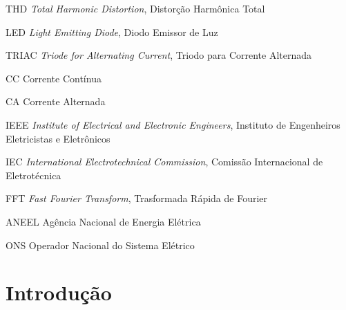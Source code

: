 \documentclass[
	12pt,				%
	openright,			%
	oneside,			%
	a4paper,			%
	chapter=TITLE,		%
	section=TITLE,		%
	subsection=TITLE,	%
	subsubsection=TITLE,%
    subsubsubsection=TITLE,%
	english,			%
    french,
    spanish,
	brazil				%
	]{utfprtex2}
\begin{document}
\listoffigures*
\cleardoublepage

\listoftables*
\cleardoublepage



 \begin{siglas}
 
    \item[THD]  \textit{Total Harmonic Distortion}, Distorção Harmônica Total
    \item[LED] \textit{Light Emitting Diode}, Diodo Emissor de Luz
    \item[TRIAC] \textit{Triode for Alternating Current}, Triodo para Corrente Alternada
    \item[CC] Corrente Contínua
    \item[CA] Corrente Alternada
    \item[IEEE] \textit{Institute of Electrical and Electronic Engineers}, Instituto de Engenheiros Eletricistas e Eletrônicos
    \item[IEC] \textit{International Electrotechnical Commission}, Comissão Internacional de Eletrotécnica
    \item[FFT] \textit{Fast Fourier Transform}, Trasformada Rápida de Fourier
    \item[ANEEL] Agência Nacional de Energia Elétrica
    \item[ONS] Operador Nacional do Sistema Elétrico
    
 \end{siglas}


\tableofcontents
\cleardoublepage






\textual

\chapter[Introdução]{Introdução}
\label{chap:intro}
\end{document}
